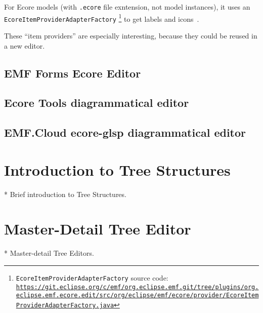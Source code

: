 For \gls{Ecore} models (with \texttt{.ecore} file exntension, not model instances), it uses an \texttt{EcoreItemProviderAdapterFactory}%
\footnote{\texttt{EcoreItemProviderAdapterFactory} source code: \href{https://git.eclipse.org/c/emf/org.eclipse.emf.git/tree/plugins/org.eclipse.emf.ecore.edit/src/org/eclipse/emf/ecore/provider/EcoreItemProviderAdapterFactory.java}{\nolinkurl{https://git.eclipse.org/c/emf/org.eclipse.emf.git/tree/plugins/org.eclipse.emf.ecore.edit/src/org/eclipse/emf/ecore/provider/EcoreItemProviderAdapterFactory.java}}}
to get labels and icons~\cite{edmerksEcoreEditorJava2021}.

These ``item providers'' are especially interesting, because they could be reused in a new editor.


\subsection{EMF Forms Ecore Editor}\label{sec:emfforms-editor}

\subsection{Ecore Tools diagrammatical editor}\label{sec:ecore-tools-editor}

\subsection{EMF.Cloud ecore-glsp diagrammatical editor}\label{sec:ecore-glsp-editor}




\section{Introduction to Tree Structures}

* Brief introduction to Tree Structures.

\section{Master-Detail Tree Editor}

* Master-detail Tree Editors. 

